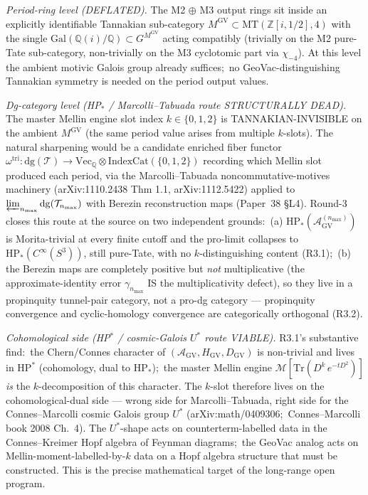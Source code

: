 \documentclass[11pt,a4paper]{article}
\theoremstyle{plain}
\theoremstyle{definition}
\newcommand{\sthree}{S^{3}}
\newcommand{\Z}{\mathbb{Z}}
\newcommand{\Q}{\mathbb{Q}}
\begin{document}
\emph{Period-ring level (DEFLATED).}  The M2 $\oplus$ M3 output
rings sit inside an explicitly identifiable Tannakian sub-category
$M^{\mathrm{GV}} \subset \mathrm{MT}(\Z[i, 1/2], 4)$ with the single
$\mathrm{Gal}(\Q(i)/\Q) \subset G^{M^{\mathrm{GV}}}$ acting compatibly
(trivially on the M2 pure-Tate sub-category, non-trivially on the M3
cyclotomic part via $\chi_{-4}$).  At this level the ambient motivic
Galois group already suffices;\ no GeoVac-distinguishing Tannakian
symmetry is needed on the period output values.

\emph{Dg-category level (HP$_*$ / Marcolli--Tabuada route
STRUCTURALLY DEAD).}  The master Mellin engine slot index
$k \in \{0, 1, 2\}$ is TANNAKIAN-INVISIBLE on the ambient
$M^{\mathrm{GV}}$ (the same period value arises from multiple
$k$-slots).  The natural sharpening would be a candidate enriched
fiber functor
$\omega^{\mathrm{tri}}: \mathrm{dg}(\mathcal{T}) \to \mathrm{Vec}_\Q \otimes
\mathrm{IndexCat}(\{0, 1, 2\})$ recording which Mellin slot produced
each period, via the Marcolli--Tabuada noncommutative-motives
machinery (arXiv:1110.2438 Thm 1.1, arXiv:1112.5422) applied to
$\varprojlim_{n_{\max}} \mathrm{dg}(\mathcal{T}_{n_{\max}})$ with Berezin
reconstruction maps (Paper~38 \S L4).  Round-3 closes this route at
the source on two independent grounds:\
(a) $\mathrm{HP}_*(\mathcal{A}_{\mathrm{GV}}^{(n_{\max})})$ is
Morita-trivial at every finite cutoff and the pro-limit collapses to
$\mathrm{HP}_*(C^\infty(\sthree))$, still pure-Tate, with no
$k$-distinguishing content (R3.1);\
(b) the Berezin maps are completely positive but \emph{not}
multiplicative (the approximate-identity error $\gamma_{n_{\max}}$
IS the multiplicativity defect), so they live in a propinquity
tunnel-pair category, not a pro-dg category --- propinquity
convergence and cyclic-homology convergence are categorically
orthogonal (R3.2).

\emph{Cohomological side (HP$^*$ / cosmic-Galois $U^*$ route
VIABLE).}  R3.1's substantive find:\ the Chern/Connes character of
$(\mathcal{A}_{\mathrm{GV}}, H_{\mathrm{GV}}, D_{\mathrm{GV}})$ is
non-trivial and lives in $\mathrm{HP}^*$ (cohomology, dual to
HP$_*$);\ the master Mellin engine
$\mathcal{M}[\mathrm{Tr}(D^k\, e^{-tD^2})]$ \emph{is} the
$k$-decomposition of this character.  The $k$-slot therefore lives on
the cohomological-dual side --- wrong side for Marcolli--Tabuada,
right side for the Connes--Marcolli cosmic Galois group $U^*$
(arXiv:math/0409306;\ Connes--Marcolli book 2008 Ch.~4).  The
$U^*$-shape acts on counterterm-labelled data in the Connes--Kreimer
Hopf algebra of Feynman diagrams;\ the GeoVac analog acts on
Mellin-moment-labelled-by-$k$ data on a Hopf algebra structure that
must be constructed.  This is the precise mathematical
target of the long-range open program.
\end{document}
